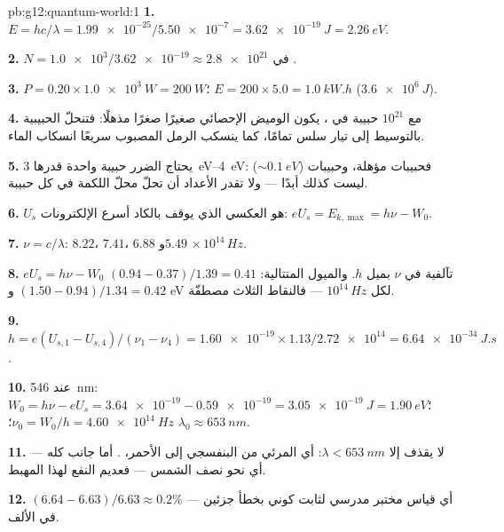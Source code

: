 \begin{solution}{pb:g12:quantum-world:1}
\textbf{1.} $E = hc/\lambda = \num{1.99e-25}/\num{5.50e-7} =
\qty{3.62e-19}{J} = \qty{2.26}{eV}$.

\textbf{2.} $N = \num{1.0e3}/\num{3.62e-19} \approx \num{2.8e21}$
 في .

\textbf{3.} $P = 0.20 \times \qty{1.0e3}{W} = \qty{200}{W}$؛
$E = 200 \times 5.0 = \qty{1.0}{kW.h}$ ($\qty{3.6e6}{J}$).

\textbf{4.} مع $10^{21}$ حبيبة في ، يكون الوميض
الإحصائي صغيرًا صغرًا مذهلًا: فتنحلّ الحبيبية بالتوسيط إلى تيار سلس
تمامًا، كما ينسكب الرمل المصبوب سريعًا انسكاب الماء.

\textbf{5.} يحتاج الضرر حبيبة واحدة قدرها \qtyrange{3}{4}{eV}: فحبيبات 
مؤهلة، وحبيبات  ($\sim \qty{0.1}{eV}$) ليست كذلك أبدًا ---
ولا تقدر الأعداد أن تحلّ محلّ اللكمة في كل حبيبة.

\textbf{6.} $U_s$ هو  العكسي الذي يوقف بالكاد أسرع
الإلكترونات: $eU_s = E_{k,\max} = h\nu - W_0$.

\textbf{7.} $\nu = c/\lambda$: $8.22$، $7.41$، $6.88$ و$5.49$
$\times\,10^{14}\,\unit{Hz}$.

\textbf{8.} $eU_s = h\nu - W_0$ تآلفية في $\nu$ بميل $h$.
والميول المتتالية: $(0.94 - 0.37)/1.39 = 0.41$ و
$(1.50 - 0.94)/1.34 = 0.42$ \unit{eV} لكل $10^{14}\,\unit{Hz}$ ---
فالنقاط الثلاث مصطفّة.

\textbf{9.} $h = e(U_{s,1}-U_{s,4})/(\nu_1-\nu_4) = \num{1.60e-19}
\times 1.13/\num{2.72e14} = \qty{6.64e-34}{J.s}$.

\textbf{10.} عند \qty{546}{nm}: $W_0 = h\nu - eU_s = \num{3.64e-19} -
\num{0.59e-19} = \qty{3.05e-19}{J} = \qty{1.90}{eV}$؛
$\nu_0 = W_0/h = \qty{4.60e14}{Hz}$؛ $\lambda_0 \approx \qty{653}{nm}$.

\textbf{11.} لا يقذف إلا $\lambda < \qty{653}{nm}$: أي المرئي من البنفسجي إلى
الأحمر، . أما جانب  كله --- أي نحو نصف
 الشمس --- فعديم النفع لهذا المهبط.

\textbf{12.} $(6.64 - 6.63)/6.63 \approx 0.2\%$ --- أي قياس مختبر مدرسي
لثابت كوني بخطأ جزئين في الألف.


\end{solution}
